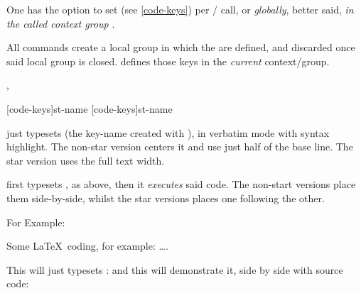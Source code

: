 \documentclass{article}
\begin{document}
\begin{codedescribe}{\setcodekeys}
	\begin{codesyntax}%
	\end{codesyntax}

One has the option to set  (see \ref{code-keys}) per \tsmacro{\tscode}{}/\tsmacro{\tsdemo}{} call, or \emph{globally}, better said, \emph{in the called context group} .\\
\begin{tsremark}[N.B.:]
All \tsobj[code]{\tscode,\tsdemo} commands create a local group  in which the  are defined, and discarded once said local group is closed. \tsmacro{\setcodekeys}{} defines those keys in the \emph{current} context/group.
\end{tsremark}
\end{codedescribe}

\begin{codedescribe}{\tscode*,\tsdemo*}
	\begin{codesyntax}%
		\tsmacro{\tscode*}[code-keys]{st-name}
		\tsmacro{\tsdemo*}[code-keys]{st-name}
	\end{codesyntax}
\tsmacro{\tscode}{} just typesets  (the key-name created with ), in verbatim mode with syntax highlight. The non-star version centers it and use just half of the base line. The star version uses the full text width.

\tsmacro{\tsdemo*}{} first typesets , as above, then it \emph{executes} said code. The non-start versions place them side-by-side, whilst the star versions places one following the other.
\end{codedescribe}


For Example:

\begin{codestore}[st=democodestore]
\begin{codestore}[stmeta]
		Some \LaTeX~coding, for example: \ldots.
\end{codestore}  
This will just typesets :
and this will demonstrate it, side by side with source code:
\end{codestore}
\end{document}
